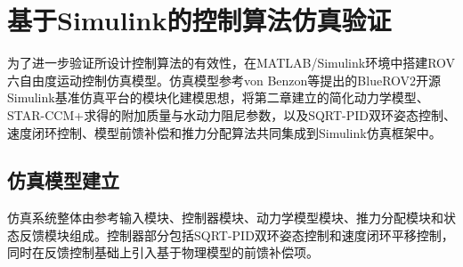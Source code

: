 


\section{基于Simulink的控制算法仿真验证}

为了进一步验证所设计控制算法的有效性，在MATLAB/Simulink环境中搭建ROV六自由度运动控制仿真模型。仿真模型参考von Benzon等提出的BlueROV2开源Simulink基准仿真平台的模块化建模思想\cite{von2022open}，将第二章建立的简化动力学模型、STAR-CCM+求得的附加质量与水动力阻尼参数，以及SQRT-PID双环姿态控制、速度闭环控制、模型前馈补偿和推力分配算法共同集成到Simulink仿真框架中。

\subsection{仿真模型建立}

仿真系统整体由参考输入模块、控制器模块、动力学模型模块、推力分配模块和状态反馈模块组成。控制器部分包括SQRT-PID双环姿态控制和速度闭环平移控制，同时在反馈控制基础上引入基于物理模型的前馈补偿项。


